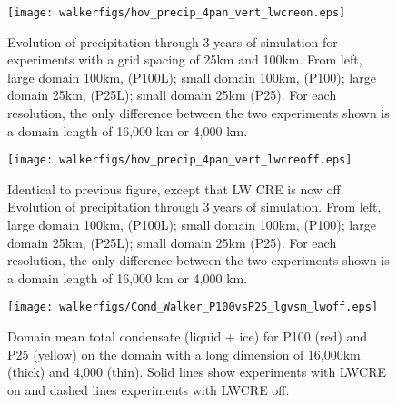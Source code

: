 \documentclass[draft]{agujournal2019}
\begin{document}
\begin{figure}
  \texttt{[image: walkerfigs/hov\_precip\_4pan\_vert\_lwcreon.eps]}
  \caption{Evolution of precipitation through 3 years of simulation for experiments with a grid spacing of
  25km and 100km.  From left, large domain 100km, (P100L); 
  small domain 100km, (P100); large domain 25km, (P25L); small domain 25km (P25).  
  For each resolution, the only difference between the two experiments shown is a domain length of 
  16,000 km or 4,000 km.}
  \label{fig:domdep}
\end{figure}

\begin{figure}
  \texttt{[image: walkerfigs/hov\_precip\_4pan\_vert\_lwcreoff.eps]}
  \caption{Identical to previous figure, except that LW CRE is now off.  Evolution of precipitation through 
  3 years of simulation.  From left, large domain 100km, (P100L); 
  small domain 100km, (P100); large domain 25km, (P25L); small domain 25km (P25).  
  For each resolution, the only difference between the two experiments shown is a domain length of 
  16,000 km or 4,000 km.}
  \label{fig:domdep_lwoff}
\end{figure}

\begin{figure}
  \centering
       \texttt{[image: walkerfigs/Cond\_Walker\_P100vsP25\_lgvsm\_lwoff.eps]}
          \caption{Domain mean total condensate (liquid + ice) for P100 (red) and P25 (yellow) on the domain 
          with a long dimension of 16,000km (thick) and 4,000 (thin).  Solid lines show experiments with LWCRE on
          and dashed lines experiments with LWCRE off.}
  \label{fig:TotCond_P25P100}
\end{figure}
\end{document}
